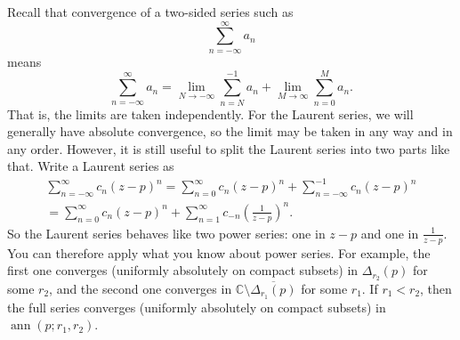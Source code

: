 \documentclass[12pt,openany]{book}
\newcommand{\ann}{\operatorname{ann}}
\newcommand{\C}{{\mathbb{C}}}
\theoremstyle{plain}
\theoremstyle{remark}
\theoremstyle{definition}
\theoremstyle{exercise}
\theoremstyle{example}
\begin{document}
Recall that convergence of a two-sided series such as
\begin{equation*}
\sum_{n=-\infty}^{\infty} a_n
\end{equation*}
means
\begin{equation*}
\sum_{n=-\infty}^{\infty} a_n
=
\lim_{N\to -\infty}
\sum_{n=N}^{-1} a_n
+
\lim_{M\to \infty}
\sum_{n=0}^{M} a_n .
\end{equation*}
That is, the limits are taken independently.
For the Laurent series,
we will generally have absolute convergence,
so the limit may be taken in any way
and in any order.
However, it is still useful to split the Laurent series into two
parts like that.
Write a Laurent series as 
\begin{multline*}
\sum_{n=-\infty}^{\infty} c_n {(z-p)}^n
=
\sum_{n=0}^{\infty} c_n {(z-p)}^n
+
\sum_{n=-\infty}^{-1} c_n {(z-p)}^n
\\
=
\sum_{n=0}^{\infty} c_n {(z-p)}^n
+
\sum_{n=1}^{\infty} c_{-n} {\left(\frac{1}{z-p}\right)}^n .
\end{multline*}
So the Laurent series behaves like two power series: one in $z-p$ and one
in $\frac{1}{z-p}$.  You can therefore apply what you know about power
series.  For example, the first one converges (uniformly absolutely on compact subsets) in $\Delta_{r_2}(p)$
for some $r_2$,
and the second one converges in $\C \setminus \overline{\Delta_{r_1}(p)}$
for some $r_1$.
If $r_1 < r_2$, then the full series converges
(uniformly absolutely on compact subsets)
in $\ann(p;r_1,r_2)$.
\end{document}
